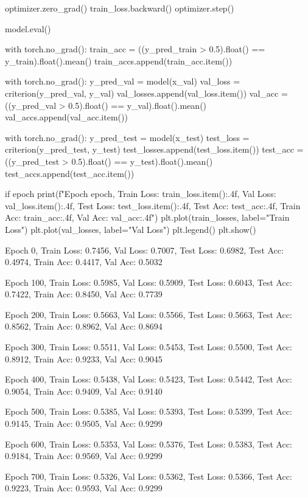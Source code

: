 \documentclass[11pt]{article}
\begin{document}
\begin{python}
    
    optimizer.zero_grad()
    train_loss.backward()
    optimizer.step()

    
    model.eval()
    
    
    with torch.no_grad():
        train_acc = ((y_pred_train > 0.5).float() == y_train).float().mean()
        train_accs.append(train_acc.item())

    
    with torch.no_grad():
        y_pred_val = model(x_val)
        val_loss = criterion(y_pred_val, y_val)
        val_losses.append(val_loss.item())
        val_acc = ((y_pred_val > 0.5).float() == y_val).float().mean()
        val_accs.append(val_acc.item())

    
    with torch.no_grad():
        y_pred_test = model(x_test)
        test_loss = criterion(y_pred_test, y_test)
        test_losses.append(test_loss.item())
        test_acc = ((y_pred_test > 0.5).float() == y_test).float().mean()
        test_accs.append(test_acc.item())

    if epoch %
        print(f"Epoch {epoch}, Train Loss: {train_loss.item():.4f}, Val Loss: {val_loss.item():.4f}, Test Loss: {test_loss.item():.4f}, Test Acc: {test_acc:.4f}, Train Acc: {train_acc:.4f}, Val Acc: {val_acc:.4f}")
plt.plot(train_losses, label="Train Loss")
plt.plot(val_losses, label="Val Loss")
plt.legend()
plt.show()
\end{python}


Epoch 0, Train Loss: 0.7456, Val Loss: 0.7007, Test Loss: 0.6982, Test Acc: 0.4974, Train Acc: 0.4417, Val Acc: 0.5032

Epoch 100, Train Loss: 0.5985, Val Loss: 0.5909, Test Loss: 0.6043, Test Acc: 0.7422, Train Acc: 0.8450, Val Acc: 0.7739

Epoch 200, Train Loss: 0.5663, Val Loss: 0.5566, Test Loss: 0.5663, Test Acc: 0.8562, Train Acc: 0.8962, Val Acc: 0.8694

Epoch 300, Train Loss: 0.5511, Val Loss: 0.5453, Test Loss: 0.5500, Test Acc: 0.8912, Train Acc: 0.9233, Val Acc: 0.9045

Epoch 400, Train Loss: 0.5438, Val Loss: 0.5423, Test Loss: 0.5442, Test Acc: 0.9054, Train Acc: 0.9409, Val Acc: 0.9140

Epoch 500, Train Loss: 0.5385, Val Loss: 0.5393, Test Loss: 0.5399, Test Acc: 0.9145, Train Acc: 0.9505, Val Acc: 0.9299

Epoch 600, Train Loss: 0.5353, Val Loss: 0.5376, Test Loss: 0.5383, Test Acc: 0.9184, Train Acc: 0.9569, Val Acc: 0.9299

Epoch 700, Train Loss: 0.5326, Val Loss: 0.5362, Test Loss: 0.5366, Test Acc: 0.9223, Train Acc: 0.9593, Val Acc: 0.9299
\end{document}
